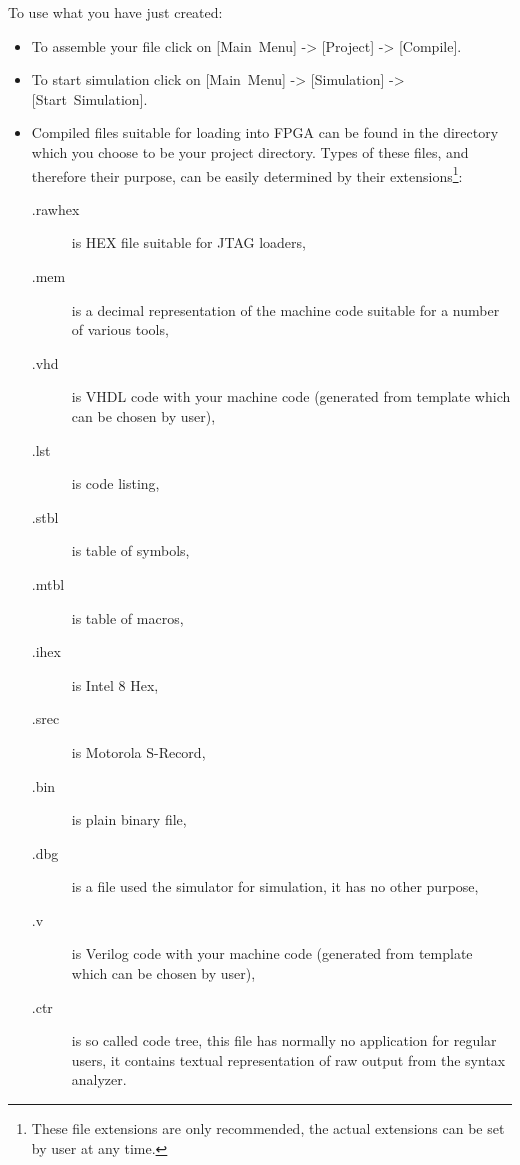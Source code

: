     To use what you have just created:
    \begin{itemize}
        \item
            To assemble your file click on [Main~Menu] -> [Project] -> [Compile].
        \item
            To start simulation click on [Main~Menu] -> [Simulation] -> [Start~Simulation].
        \item
            Compiled files suitable for loading into FPGA can be found in the directory which you choose to be your project directory. Types of these files, and therefore their purpose, can be easily determined by their extensions\footnote{These file extensions are only recommended, the actual extensions can be set by user at any time.}:
            \begin{description}
                \item [.rawhex] is HEX file suitable for JTAG loaders,
                \item [.mem] is a decimal representation of the machine code suitable for a number of various tools,
                \item [.vhd] is VHDL code with your machine code (generated from template which can be chosen by user),
                \item [.lst] is code listing,
                \item [.stbl] is table of symbols,
                \item [.mtbl] is table of macros,
                \item [.ihex] is Intel 8 Hex,
                \item [.srec] is Motorola S-Record,
                \item [.bin] is plain binary file,
                \item [.dbg] is a file used the simulator for simulation, it has no other purpose,
                \item [.v] is Verilog code with your machine code (generated from template which can be chosen by user),
                \item [.ctr] is so called code tree, this file has normally no application for regular users, it contains textual representation of raw output from the syntax analyzer.
            \end{description}
    \end{itemize}

